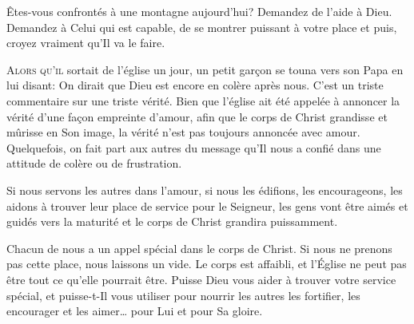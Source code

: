 Êtes-vous confrontés à une montagne aujourd'hui? Demandez de l'aide à Dieu.
 Demandez à Celui qui est capable, de se montrer puissant à votre place
 \ocadr et puis, croyez vraiment qu'Il va le faire.

\dvrule







\lettrine{A}{lors qu'il} sortait de l'église un jour,
 un petit gar\c{c}on se touna vers son Papa  en lui disant: 
 \Og On dirait que Dieu est encore en colère après nous. \Fg{}
 C'est un triste commentaire sur une triste vérité.
 Bien que l'église ait été appelée à annoncer la vérité
 d'une fa\c{c}on empreinte d'amour, afin que le corps de Christ grandisse
 et mûrisse en Son image, la vérité n'est pas toujours annoncée avec amour.
 Quelquefois, on fait part aux autres du message
 qu'Il nous a confié dans une attitude de colère ou de frustration. 


Si nous servons les autres dans l'amour, si nous les édifions,
 les encourageons, les aidons à trouver leur place de service
 pour le Seigneur, les gens vont être aimés et guidés
 vers la maturité
 \ocadr et le corps de Christ grandira puissamment.

Chacun de nous a un appel spécial dans le corps de Christ.
 Si nous ne prenons pas cette place, nous laissons un vide.
 Le corps est affaibli, et l'Église 
 ne peut pas être tout ce qu'elle pourrait être.
 Puisse Dieu vous aider à trouver votre service spécial,
 et puisse-t-Il vous utiliser pour nourrir les autres
 \ocadr les fortifier, les encourager et les aimer\dots{}
 pour Lui et pour Sa gloire.

